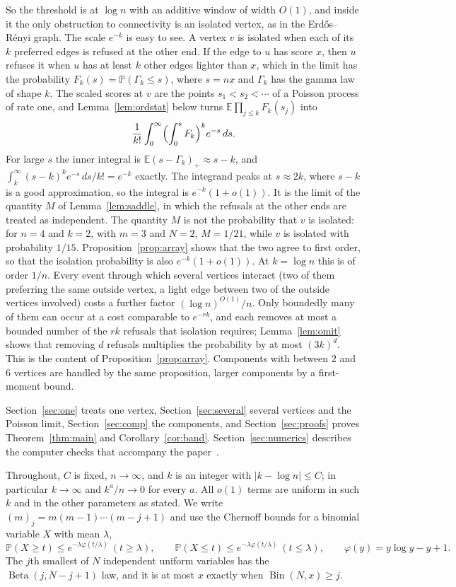 \documentclass[11pt]{amsart}
\theoremstyle{remark}
\numberwithin{equation}{section}
\newcommand{\E}{\mathbb E}
\newcommand{\Pp}{\mathbb P}
\newcommand{\Bin}{\operatorname{Bin}}
\newcommand{\Bet}{\operatorname{Beta}}
\newcommand{\1}{\mathbf 1}
\begin{document}
So the threshold is at $\log n$ with an additive window of width $O(1)$, and inside it the only obstruction to connectivity is an isolated vertex, as in the Erd\H{o}s--R\'enyi graph. The scale $e^{-k}$ is easy to see. A vertex $v$ is isolated when each of its $k$ preferred edges is refused at the other end. If the edge to $u$ has score $x$, then $u$ refuses it when $u$ has at least $k$ other edges lighter than $x$, which in the limit has the probability $F_k(s)=\Pp(\Gamma_k\le s)$, where $s=nx$ and $\Gamma_k$ has the gamma law of shape $k$. The scaled scores at $v$ are the points $s_1<s_2<\cdots$ of a Poisson process of rate one, and Lemma~\ref{lem:ordstat} below turns $\E\prod_{j\le k}F_k(s_j)$ into
\[
\frac1{k!}\int_0^\infty\Bigl(\int_0^sF_k\Bigr)^ke^{-s}\,ds .
\]
For large $s$ the inner integral is $\E(s-\Gamma_k)_+\approx s-k$, and $\int_k^\infty(s-k)^ke^{-s}\,ds/k!=e^{-k}$ exactly. The integrand peaks at $s\approx2k$, where $s-k$ is a good approximation, so the integral is $e^{-k}(1+o(1))$. It is the limit of the quantity $M$ of Lemma~\ref{lem:saddle}, in which the refusals at the other ends are treated as independent. The quantity $M$ is not the probability that $v$ is isolated: for $n=4$ and $k=2$, with $m=3$ and $N=2$, $M=1/21$, while $v$ is isolated with probability $1/15$. Proposition~\ref{prop:array} shows that the two agree to first order, so that the isolation probability is also $e^{-k}(1+o(1))$. At $k=\log n$ this is of order $1/n$. Every event through which several vertices interact (two of them preferring the same outside vertex, a light edge between two of the outside vertices involved) costs a further factor $(\log n)^{O(1)}/n$. Only boundedly many of them can occur at a cost comparable to $e^{-rk}$, and each removes at most a bounded number of the $rk$ refusals that isolation requires; Lemma~\ref{lem:omit} shows that removing $d$ refusals multiplies the probability by at most $(3k)^d$. This is the content of Proposition~\ref{prop:array}. Components with between $2$ and $6$ vertices are handled by the same proposition, larger components by a first-moment bound.

Section~\ref{sec:one} treats one vertex, Section~\ref{sec:several} several vertices and the Poisson limit, Section~\ref{sec:comp} the components, and Section~\ref{sec:proofs} proves Theorem~\ref{thm:main} and Corollary~\ref{cor:band}. Section~\ref{sec:numerics} describes the computer checks that accompany the paper~\cite{code}.

Throughout, $C$ is fixed, $n\to\infty$, and $k$ is an integer with $|k-\log n|\le C$; in particular $k\to\infty$ and $k^a/n\to0$ for every $a$. All $o(1)$ terms are uniform in such $k$ and in the other parameters as stated. We write $(m)_j=m(m-1)\cdots(m-j+1)$ and use the Chernoff bounds for a binomial variable $X$ with mean $\lambda$,
\begin{equation}\label{eq:chernoff}
\Pp(X\ge t)\le e^{-\lambda\varphi(t/\lambda)}\ (t\ge\lambda),\qquad
\Pp(X\le t)\le e^{-\lambda\varphi(t/\lambda)}\ (t\le\lambda),\qquad
\varphi(y)=y\log y-y+1 .
\end{equation}
The $j$th smallest of $N$ independent uniform variables has the $\Bet(j,N-j+1)$ law, and it is at most $x$ exactly when $\Bin(N,x)\ge j$.
\end{document}
